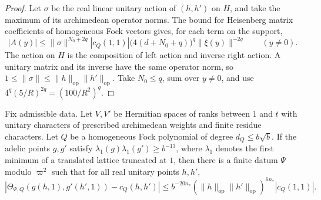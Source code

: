 \begin{proof}
Let $\sigma$ be the real linear unitary action of $(h,h')$ on $H$, and take the maximum of its archimedean operator norms. The bound for Heisenberg matrix coefficients of homogeneous Fock vectors gives, for each term on the support,
\[
 |A(y)|\le
  \|\sigma\|^{N_0+2q}|c_Q(1,1)|
        \bigl(4(d+N_0+q)\bigr)^q\|\xi(y)\|^{-2q}
 \qquad (y\ne0).
\]
The action on $H$ is the composition of left action and inverse right action. A unitary matrix and its inverse have the same operator norm, so $1\le\|\sigma\|\le\|h\|_{\mathrm{op}}\|h'\|_{\mathrm{op}}$. Take $N_0\le q$, sum over $y\ne0$, and use $4^q(5/R)^{2q}=(100/R^2)^q$.
\end{proof}

\begin{lemma}
\label{lem:c-kernel-sparse-specialization}
\emitthmsource
Fix admissible data. Let $V,V'$ be Hermitian spaces of ranks between $1$ and $t$ with unitary characters of prescribed archimedean weights and finite residue characters. Let $Q$ be a homogeneous Fock polynomial of degree $d_Q\le b\sqrt b$. If the adelic points $g,g'$ satisfy $\lambda_1(g)\lambda_1(g')\ge b^{-13}$, where $\lambda_1$ denotes the first minimum of a translated lattice truncated at $1$, then there is a finite datum $\Psi$ modulo $\varpi^2$ such that for all real unitary points $h,h'$,
\[
 \left|\Theta_{\Psi,Q}(g(h,1),g'(h',1))-c_Q(h,h')\right|
 \le b^{-20n_*}
 (\|h\|_{\mathrm{op}}\|h'\|_{\mathrm{op}})^{6n_*}
 |c_Q(1,1)| .
\]
\end{lemma}


